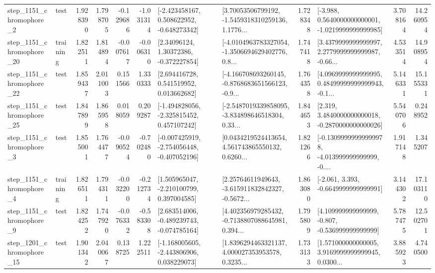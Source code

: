 \begin{tabular}{llrrrrllrlrr}
  step\_1151\_chromophore\_2 &      test &      1.928390 &    1.798705 &     -0.129686 & -1.031314 &   [-2.423458167, 0.508622952, -0.648273342] &  [3.70053506799192, -1.5459318310259136, 1.1776... &       1.728348 &  [-3.988, 0.5640000000000001, -1.0219999999999985] &            3.708164 &         14.260954 \\
 step\_1151\_chromophore\_20 &  training &      1.822511 &    1.814894 &     -0.007617 & -0.006310 &      [2.34096124, 1.30372386, -0.372227854] &  [-4.0104963783327054, -1.3506694629402776, 0.8... &       1.747418 &  [3.4379999999999997, 2.2779999999999987, -0.66... &            4.533514 &         14.908954 \\
 step\_1151\_chromophore\_22 &      test &      1.859437 &    2.011003 &      0.151566 &  1.330333 &     [2.694416728, 0.541519952, 0.013662682] &  [-4.166708693260145, -0.8768683651566123, -0.9... &       1.764358 &  [4.0969999999999995, 0.48499999999999943, -0.1... &            5.146331 &         15.155331 \\
 step\_1151\_chromophore\_25 &      test &      1.847899 &    1.865958 &      0.018059 &  0.209287 &   [-1.494828056, -2.325815452, 0.457107242] &  [-2.5487019339858095, -3.834898646518304, 0.33... &       1.844653 &   [2.319, 3.4840000000000018, -0.2870000000000026] &            5.540706 &          0.248952 \\
  step\_1151\_chromophore\_3 &      test &      1.855001 &    1.764477 &     -0.090524 & -0.702480 &  [-0.007425919, -2.754056448, -0.407052196] &  [0.0434219524413654, 4.561743865550132, 0.6260... &       1.821266 &  [-0.13099999999999978, -4.013999999999999, -0.... &            1.917148 &          1.345207 \\
  step\_1151\_chromophore\_4 &  training &      1.826511 &    1.794311 &     -0.032200 & -0.212734 &    [1.505965047, -2.210100799, 0.397004585] &  [2.25764611949643, -3.615911832842327, -0.5672... &       1.863080 &               [-2.061, 3.393, -0.6649999999999991] &            3.144302 &         17.103110 \\
  step\_1151\_chromophore\_9 &      test &      1.824252 &    1.747920 &     -0.076332 & -0.583308 &   [2.683514006, -0.489239743, -0.074785164] &  [4.402356979285432, -0.7138807088645981, 0.394... &       1.795809 &    [4.109999999999999, -0.807, -0.536999999999999] &            5.787475 &         12.502701 \\
 step\_1201\_chromophore\_15 &      test &      1.901342 &    2.040067 &      0.138725 &  1.222511 &   [-1.168005605, -2.443806906, 0.038229073] &  [1.8396294463321137, 4.000027353953578, 0.3235... &       1.733133 &  [1.571000000000005, 3.9169999999999945, 0.0300... &            3.885923 &          4.740500 \\

\end{tabular}

